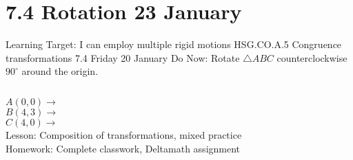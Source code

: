 \section{7.4 Rotation \hfill 23 January \,}
\begin{frame}{Learning Target: I can employ multiple rigid motions}
  {HSG.CO.A.5 Congruence transformations \hfill \alert{7.4 Friday 20 January}}
  Do Now: Rotate $\triangle ABC$ counterclockwise $90^\circ$ around the origin.  \vspace{0.5cm}
  \begin{columns}
    $A(0,0) \rightarrow$ \\[0.3cm]
    $B(4,3) \rightarrow$ \\[0.3cm]
    $C(4,0) \rightarrow$ \\[0.3cm]
    Lesson: Composition of transformations, mixed practice \\[0.5cm]
    Homework: Complete classwork, Deltamath assignment
    \begin{flushright}
    \end{flushright}
  \end{columns}
\end{frame}

